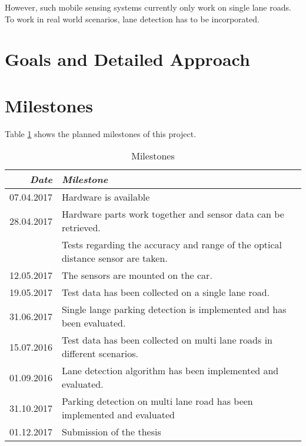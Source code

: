 \documentclass[11pt,a4paper,titlepage,
chapterprefix,headsepline,parskip,pdftex,
,pointlessnumbers,bibtotoc]{article}
\begin{document}
However, such mobile sensing systems currently only work on single lane roads. To work in real world scenarios, lane detection has to be incorporated. 



\section{Goals and Detailed Approach}



\section{Milestones}

Table \ref{tab:milestones} shows the planned milestones of this project.

\begin{table}[h]
\centering
\begin{tabular}{r|l}
\emph{Date} & \emph{Milestone} \\\hline
07.04.2017 & Hardware is available \\
28.04.2017 & Hardware parts work together and sensor data can be retrieved. \\
 & Tests regarding the accuracy and range of the optical distance sensor are taken. \\
12.05.2017 & The sensors are mounted on the car. \\
19.05.2017 & Test data has been collected on a single lane road. \\
31.06.2017 & Single lange parking detection is implemented and has been evaluated. \\
15.07.2016 & Test data has been collected on multi lane roads in different scenarios. \\
01.09.2016 & Lane detection algorithm has been implemented and evaluated. \\
31.10.2017 & Parking detection on multi lane road has been implemented and evaluated \\
01.12.2017 & Submission of the thesis
\end{tabular}
\caption{\label{tab:milestones} Milestones}
\end{table}


%

% 



%
\end{document}
